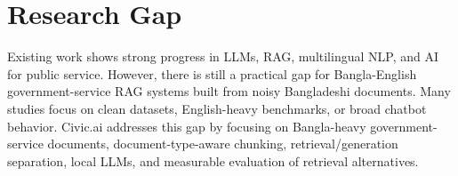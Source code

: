 \section{Research Gap}
Existing work shows strong progress in LLMs, RAG, multilingual NLP, and AI for public service. However, there is still a practical gap for Bangla-English government-service RAG systems built from noisy Bangladeshi documents. Many studies focus on clean datasets, English-heavy benchmarks, or broad chatbot behavior. Civic.ai addresses this gap by focusing on Bangla-heavy government-service documents, document-type-aware chunking, retrieval/generation separation, local LLMs, and measurable evaluation of retrieval alternatives.
